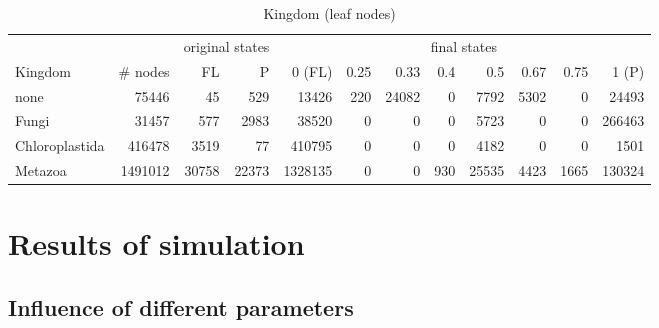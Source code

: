      \begin{table}
        \begin{center}
          \hspace*{-2cm}\begin{tabular}{ |l|r||r|r||r|r|r|r|r|r|r|r| }
            \hline
            & & \multicolumn{2}{c||}{original states} & \multicolumn{8}{c|}{final states} \\
            Kingdom & \# nodes & FL & P
              & 0 (FL) & 0.25 & 0.33 & 0.4 & 0.5 & 0.67 & 0.75 & 1 (P) \\
            \hline \hline
            none & 75446 & 45 & 529 
              & 13426 & 220 & 24082 & 0 & 7792 & 5302 & 0 & 24493 \\
            Fungi & 31457 & 577 & 2983
              & 38520 & 0 & 0 & 0 & 5723 & 0 & 0 & 266463 \\
            Chloroplastida & 416478 & 3519 & 77
              & 410795 & 0 & 0 & 0 & 4182 & 0 & 0 & 1501 \\
            Metazoa & 1491012 & 30758 & 22373
              & 1328135 & 0 & 0 & 930 & 25535 & 4423 & 1665 & 130324 \\
            \hline  
          \end{tabular}
        \end{center}
        \caption{Kingdom (leaf nodes)}
      \end{table}

  \section{Results of simulation}

    \subsection{Influence of different parameters}

